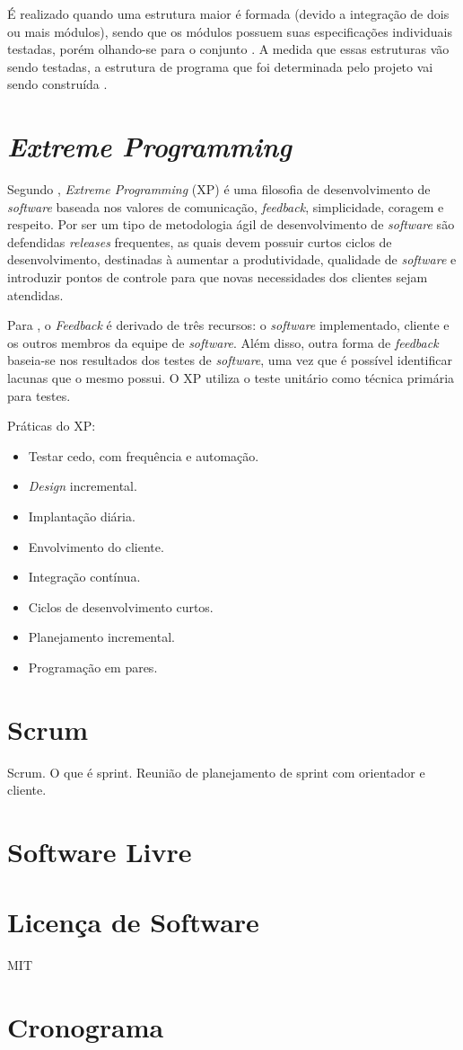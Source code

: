     É realizado quando uma estrutura maior é formada (devido a integração de dois ou mais módulos), sendo que os módulos possuem suas especificações individuais testadas, porém olhando-se para o conjunto \cite{sw_test_tech}. A medida que essas estruturas vão sendo testadas, a estrutura de programa que foi determinada pelo projeto vai sendo construída \cite{maldonado}.

\section{\textit{Extreme Programming}}
Segundo \cite{beck_2004}, \textit{Extreme Programming} (XP) é uma filosofia de desenvolvimento de
\textit{software} baseada nos valores de comunicação, \textit{feedback}, simplicidade, coragem e respeito.
Por ser um tipo de metodologia ágil de desenvolvimento de \textit{software} são defendidas \textit{releases}
frequentes, as quais devem possuir curtos ciclos de desenvolvimento, destinadas à aumentar a produtividade, qualidade de \textit{software} e introduzir pontos de controle para que novas necessidades dos clientes sejam atendidas.

Para \cite{pressman_2009}, o \textit{Feedback} é derivado de três recursos: o \textit{software} implementado, cliente e os outros membros da equipe de \textit{software}. Além disso, outra forma de \textit{feedback} baseia-se nos resultados dos testes de \textit{software}, uma vez que é possível identificar
lacunas que o mesmo possui. O XP utiliza o teste unitário como técnica primária para testes.

Práticas do XP:

\begin{itemize}
    \item Testar cedo, com frequência e automação.
    \item \textit{Design} incremental.
    \item Implantação diária.
    \item Envolvimento do cliente.
    \item Integração contínua.
    \item Ciclos de desenvolvimento curtos.
    \item Planejamento incremental.
    \item Programação em pares.
\end{itemize}

\section{Scrum}
Scrum.
O que é sprint.
Reunião de planejamento de sprint com orientador e cliente.

\section{Software Livre}

\section{Licença de Software}
MIT

\section{Cronograma}
